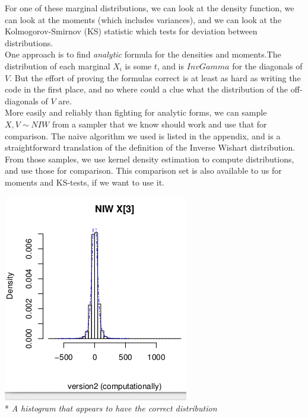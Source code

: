 \documentclass[english]{report}
\begin{document}
For one of these marginal distributions, we can look at the density function, we can look at the moments (which includes variances), and we can look at the Kolmogorov-Smirnov (KS) statistic which tests for deviation between distributions.\\

One approach is to find \emph{analytic} formula for the densities and moments.The distribution of each marginal $X_i$ is \cite{???} some $t$, and is $InvGamma$ \cite{Wikipedia2} for the diagonals of $V$. But the effort of proving the formulas correct is at least as hard as writing the code in the first place, and no where could a clue what the distribution of the off-diagonals of $V$ are.\\

More easily and reliably than fighting for analytic forms, we can sample $X,V \sim NIW$ from a sampler that we know should work and use that for comparison.
The naive algorithm we used is listed in the appendix, and is a straightforward translation of the definition of the Inverse Wishart distribution.
From those samples, we use kernel density estimation to compute distributions, and use those for comparison. This comparison set is also available to us for moments and KS-tests, if we want to use it.

\begin{center}
\includegraphics[scale=.8]{densitycorrect.png}\\*
\emph{A histogram that appears to have the correct distribution}
\end{center}
\end{document}
